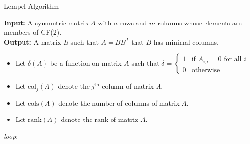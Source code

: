 \documentclass{article}
\theoremstyle{definition}
\theoremstyle{problem}
\theoremstyle{lemma}
\begin{document}
		\begin{algorithm}			
			\caption{Lempel Algorithm}
			\label{alg_lempel}
			\textbf{Input:} A symmetric matrix $A$ with $n$ rows and $m$ columns whose elements are members of GF(2).\\
			\textbf{Output:} A matrix $B$ such that $A=BB^T$ that $B$ has minimal columns.
			\begin{itemize}
				\item {Let $\delta(A)$ be a function on matrix $A$ such that $\delta = \left\{\begin{array}{cl}
					1 & \text{if }A_{i,i} = 0\text{ for all }i \\
					0 & \text{otherwise}		
					\end{array}\right.$}
				\item Let $\text{col}_j(A)$ denote the $j^{\text{th}}$ column of matrix $A$.
				\item Let $\text{cols}(A)$ denote the number of columns of matrix $A$.
				\item Let $\text{rank}(A)$ denote the rank of matrix $A$.				
			\end{itemize}			
			\begin{algorithmic}[1]
					\Else				
				\BState \emph{loop}:
							\EndIf
							\Else
							\EndIf
					\EndIf
				\EndProcedure
			\end{algorithmic}
		\end{algorithm}
	
\end{document}
